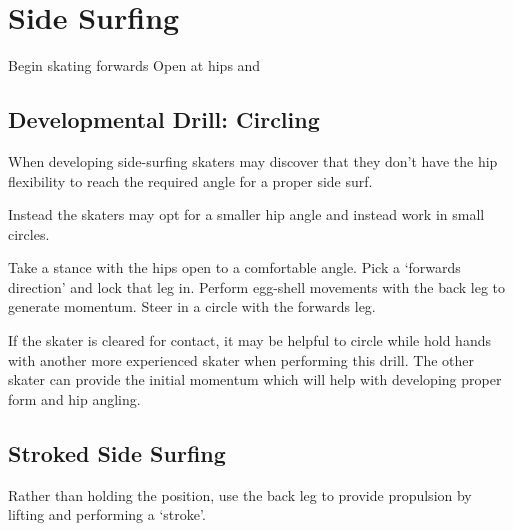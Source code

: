 \section{Side Surfing}
\label{sec:sticky/side_surf}

Begin skating forwards
Open at hips and    



\subsection*{Developmental Drill: Circling}

When developing side-surfing skaters may discover that they don't have the hip flexibility to reach the required angle for a proper side surf.   

Instead the skaters may opt for a smaller hip angle and instead work in small circles. 

\begin{itemize}
Take a stance with the hips open to a comfortable angle.
Pick a `forwards direction' and lock that leg in. 
Perform egg-shell movements with the back leg to generate momentum. 
Steer in a circle with the forwards leg.
\end{itemize}


If the skater is cleared for contact, it may be helpful to circle while hold hands with another more experienced skater when performing this drill.  
The other skater can provide the initial momentum which will help with developing proper form and hip angling.  

\subsection*{Stroked Side Surfing}

Rather than holding the position, use the back leg to provide propulsion by lifting and performing a `stroke'.    
